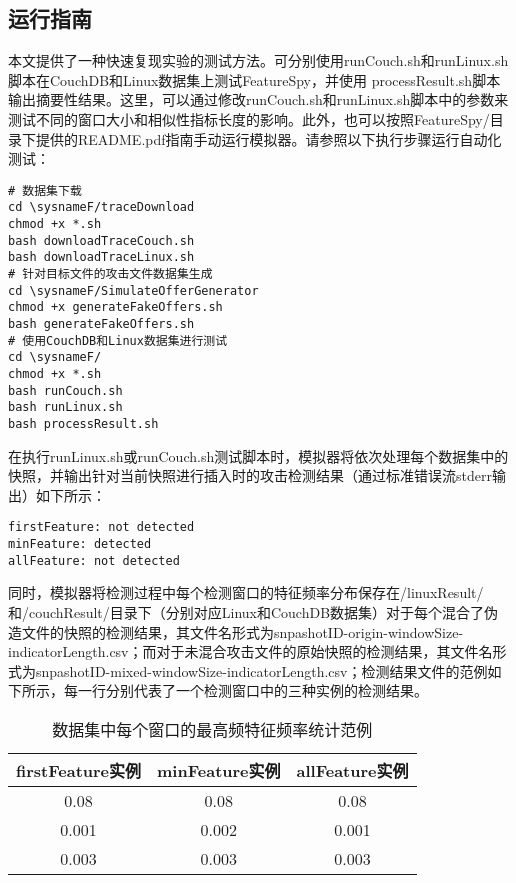 \subsection*{运行指南}
本文提供了一种快速复现实验的测试方法。可分别使用runCouch.sh和runLinux.sh脚本在CouchDB和Linux数据集上测试FeatureSpy，并使用 processResult.sh脚本输出摘要性结果。这里，可以通过修改runCouch.sh和runLinux.sh脚本中的参数来测试不同的窗口大小和相似性指标长度的影响。此外，也可以按照FeatureSpy/目录下提供的README.pdf指南手动运行模拟器。请参照以下执行步骤运行自动化测试：

\begin{lstlisting}[style=shell]
# 数据集下载
cd \sysnameF/traceDownload
chmod +x *.sh
bash downloadTraceCouch.sh
bash downloadTraceLinux.sh
# 针对目标文件的攻击文件数据集生成
cd \sysnameF/SimulateOfferGenerator
chmod +x generateFakeOffers.sh
bash generateFakeOffers.sh
# 使用CouchDB和Linux数据集进行测试
cd \sysnameF/
chmod +x *.sh
bash runCouch.sh
bash runLinux.sh
bash processResult.sh
\end{lstlisting}

在执行runLinux.sh或runCouch.sh测试脚本时，模拟器将依次处理每个数据集中的快照，并输出针对当前快照进行插入时的攻击检测结果（通过标准错误流stderr输出）如下所示：

\begin{lstlisting}[style=shell]
firstFeature: not detected
minFeature: detected
allFeature: not detected
\end{lstlisting}

同时，模拟器将检测过程中每个检测窗口的特征频率分布保存在\sysnameF/linuxResult/和\sysnameF/couchResult/目录下（分别对应Linux和CouchDB数据集）对于每个混合了伪造文件的快照的检测结果，其文件名形式为{snpashotID}-origin-{windowSize}-{indicatorLength}.csv；而对于未混合攻击文件的原始快照的检测结果，其文件名形式为{snpashotID}-mixed-{windowSize}-{indicatorLength}.csv；检测结果文件的范例如下所示，每一行分别代表了一个检测窗口中\sysnameF 的三种实例的检测结果。

\begin{table}[!htb]
    \small
    \centering
    \begin{tabular}{ccc}
        \toprule
        firstFeature实例 & minFeature实例 & allFeature实例 \\
        \midrule
        0.08             & 0.08           & 0.08           \\
        0.001            & 0.002          & 0.001          \\
        0.003            & 0.003          & 0.003          \\
        \bottomrule
    \end{tabular}
    \caption{数据集中每个窗口的最高频特征频率统计范例}
    \label{tab:system-detection-window}
\end{table}

